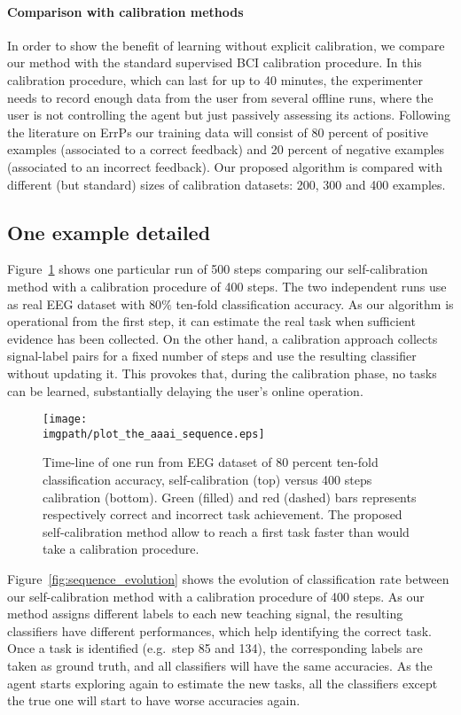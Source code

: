 \paragraph{Comparison with calibration methods} In order to show the benefit of learning without explicit calibration, we compare our method with the standard supervised BCI calibration procedure. In this calibration procedure, which can last for up to 40 minutes, the experimenter needs to record enough data from the user from several offline runs, where the user is not controlling the agent but just passively assessing its actions. Following the literature on ErrPs \cite{chavarriaga2010learning,iturrate2013task} our training data will consist of 80 percent of positive examples (associated to a correct feedback) and 20 percent of negative examples (associated to an incorrect feedback). Our proposed algorithm is compared with different (but standard) sizes of calibration datasets: 200, 300 and 400 examples.

\subsection{One example detailed}
Figure~\ref{fig:sequence} shows one particular run of 500 steps comparing our self-calibration method with a calibration procedure of 400 steps. The two independent runs use as real EEG dataset with $80\%$ ten-fold classification accuracy. As our algorithm is operational from the first step, it can estimate the real task when sufficient evidence has been collected. On the other hand, a calibration approach collects signal-label pairs for a fixed number of steps and use the resulting classifier without updating it. This provokes that, during the calibration phase, no tasks can be learned, substantially delaying the user's online operation.

\begin{figure}[!ht]
\centering
\texttt{[image: \\imgpath/plot\_the\_aaai\_sequence.eps]}
\caption{Time-line of one run from EEG dataset of $80$ percent ten-fold classification accuracy, self-calibration (top) versus 400 steps calibration (bottom). Green (filled) and red (dashed) bars represents respectively correct and incorrect task achievement. The proposed self-calibration method allow to reach a first task faster than would take a calibration procedure.}
\label{fig:sequence}
\end{figure} 



Figure~\ref{fig:sequence_evolution} shows the evolution of classification rate between our self-calibration method with a calibration procedure of 400 steps. As our method assigns different labels to each new teaching signal, the resulting classifiers have different performances, which help identifying the correct task. Once a task is identified (e.g.\ step 85 and 134), the corresponding labels are taken as ground truth, and all classifiers will have the same accuracies. As the agent starts exploring again to estimate the new tasks, all the classifiers except the true one will start to have worse accuracies again.

